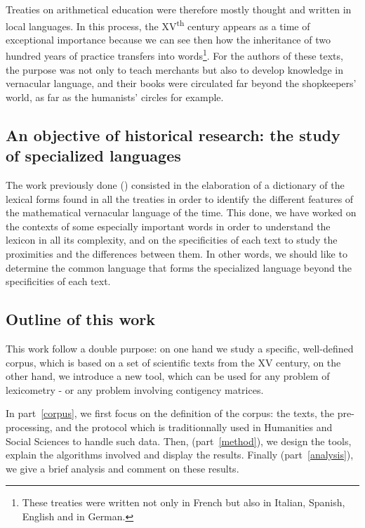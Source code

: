\documentclass{elsarticle}
\begin{document}
Treaties on arithmetical education were therefore mostly thought and written in local languages. In this process, the XV\textsuperscript{th} century appears as a time of exceptional importance because we can see then how the inheritance of two hundred years of practice transfers into words\footnote{These treaties were written not only in French but also in Italian, Spanish, English and in German.}. For the authors of these texts, the purpose was not only to teach merchants but also to develop knowledge in vernacular language, and their books were circulated far beyond the shopkeepers' world, as far as the humanists' circles for example.\\

\subsection*{An objective of historical research: the study of specialized languages}

The work previously done (\cite{lamasse2012}) consisted in the elaboration of a dictionary of the lexical forms found in all the treaties in order to identify the different features of the mathematical vernacular language of the time. This done, we have worked on the contexts of some especially important words in order to understand the lexicon in all its complexity, and on the specificities of each text to study the proximities and the differences between them. In other words, we should like to determine the common language that forms the specialized language beyond the specificities of each text.

\subsection*{Outline of this work}

This work follow a double purpose: on one hand we study a specific, well-defined corpus, which is based on a set of scientific texts from the XV century, on the other hand, we introduce a new tool, which can be used for any problem of lexicometry - or any problem involving contigency matrices.

In part~\ref{corpus}, we first focus on the definition of the corpus: the texts, the pre-processing, and the protocol which is traditionnally used in Humanities and Social Sciences to handle such data. Then, (part~\ref{method}), we design the tools, explain the algorithms involved and display the results. Finally (part~\ref{analysis}), we give a brief analysis and comment on these results.
\end{document}
